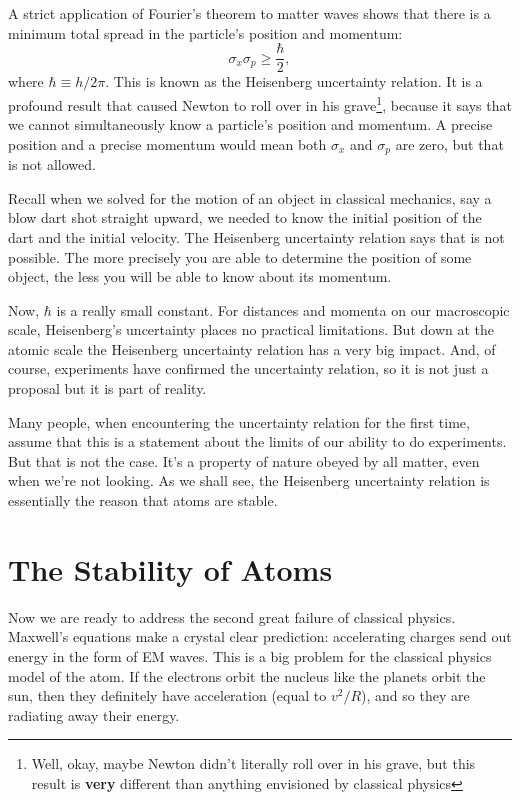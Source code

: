 A strict application of Fourier's theorem to matter waves shows that 
there is a minimum total spread in the particle's position and momentum:
\begin{equation}
  \sigma_x \sigma_p \geq \frac{\hbar}{2} ,
  \label{eq:heisenberg_uncertainty}
\end{equation}
where $\hbar \equiv h/2\pi$.
This is known as the Heisenberg uncertainty relation.  It is a profound
result that caused Newton to roll over in his grave\footnote{Well, okay,
maybe Newton didn't literally roll over in his grave, but this result
is {\bf very} different than anything envisioned by classical physics},
because it says that we cannot simultaneously know a particle's position
and momentum.  A precise position and a precise momentum would mean both
$\sigma_x$ and $\sigma_p$ are zero, but that is not allowed.

Recall when we solved for the motion of an object in classical
mechanics, say a blow dart shot straight upward, we needed to know
the initial position of the dart and the initial velocity.  The
Heisenberg uncertainty relation says that is not possible.  The
more precisely you are able to determine the position of some
object, the less you will be able to know about its momentum.

Now, $\hbar$ is a really small constant.  For distances and momenta on
our macroscopic scale, Heisenberg's uncertainty places no practical
limitations.  But down at the atomic scale the Heisenberg uncertainty
relation has a very big impact.  And, of course, experiments have
confirmed the uncertainty relation, so it is not just a proposal but
it is part of reality.

Many people, when encountering the uncertainty relation for the first
time, assume that this is a statement about the limits of our ability
to do experiments.  But that is not the case.  It's a property of
nature obeyed by all matter, even when we're not looking.  As we shall
see, the Heisenberg uncertainty relation is essentially the reason
that atoms are stable.

\section{The Stability of Atoms}

Now we are ready to address the second great failure of classical physics.
Maxwell's equations make a crystal clear prediction: accelerating charges
send out energy in the form of EM waves.  This is a big problem for the
classical physics model of the atom.  If the electrons orbit the nucleus
like the planets orbit the sun, then they definitely have acceleration
(equal to $v^2/R$), and so they are radiating away their energy.

